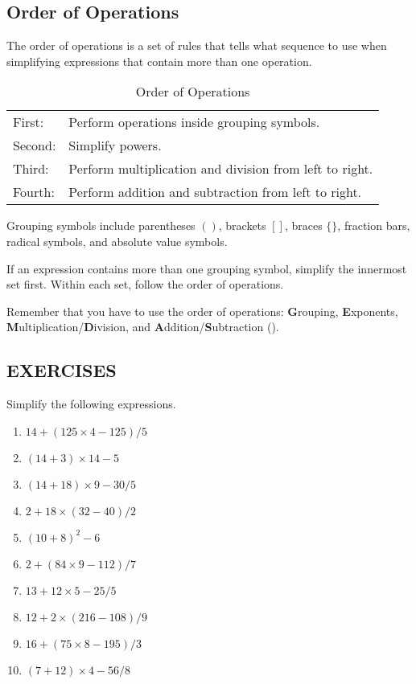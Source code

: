 \subsection*{Order of Operations}
The order of operations is a set of rules that tells what sequence to use when simplifying
expressions that contain more than one operation.
\begin{table}[!h]
\centering
\caption{Order of Operations}
\begin{tabular}{ll}
\hline \hline
First: & Perform operations inside grouping symbols.\\
Second: & Simplify powers.\\
Third: & Perform multiplication and division from left to right.\\
Fourth: & Perform addition and subtraction from left to right.\\
\hline
\end{tabular}
\end{table}
Grouping symbols include parentheses $()$, brackets $[]$, braces $\{\}$, fraction bars, radical
symbols, and absolute value symbols.

If an expression contains more than one grouping symbol, simplify the innermost set first.
Within each set, follow the order of operations.

Remember that you have to use the order of operations: \textbf{G}rouping, \textbf{E}xponents,
\textbf{M}ultiplication/\textbf{D}ivision, and \textbf{A}ddition/\textbf{S}ubtraction ().

\subsection*{EXERCISES}
Simplify the following expressions.
\begin{multicols}{2}
\begin{enumerate}
\item $14+(125\times4-125)/5$
\item $(14+3)\times 14-5$
\item $(14+18)\times 9-30/5$
\item $2+18\times(32-40)/2$
\item $(10+8)^2-6$
\item $2+(84\times 9-112)/7$
\item $13+12\times 5-25/5$
\item $12+2\times (216-108)/9$
\item $16+(75\times 8-195)/3$
\item $(7+12)\times 4-56/8$
\end{enumerate}
\end{multicols}
